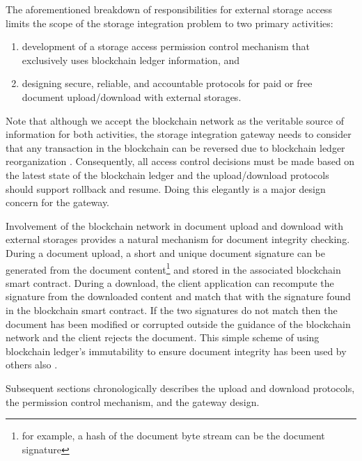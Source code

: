 The aforementioned breakdown of responsibilities for external storage access limits the scope of the storage integration problem to two primary activities: 

\begin{enumerate}
\item development of a storage access permission control mechanism that exclusively uses blockchain ledger information, and
\item designing secure, reliable, and accountable protocols for paid or free document upload/download with external storages. 
\end{enumerate}          

Note that although we accept the blockchain network as the veritable source of information for both activities, the storage integration gateway needs to consider that any transaction in the blockchain can be reversed due to blockchain ledger reorganization \cite{reorg}. Consequently, all access control decisions must be made based on the latest state of the blockchain ledger and the upload/download protocols should support rollback and resume. Doing this elegantly is a major design concern for the gateway.

Involvement of the blockchain network in document upload and download with external storages provides a natural mechanism for document integrity checking. During a document upload, a short and unique document signature can be generated from the document content\footnote{for example, a hash of the document byte stream can be the document signature} and stored in the associated blockchain smart contract. During a download, the client application can recompute the signature from the downloaded content and match that with the signature found in the blockchain smart contract. If the two signatures do not match then the document has been modified or corrupted outside the guidance of the blockchain network and the client rejects the document. This simple scheme of using blockchain ledger's immutability to ensure document integrity has been used by others also \cite{stampIO}.  

Subsequent sections chronologically describes the upload and download protocols, the permission control mechanism, and the gateway design.
